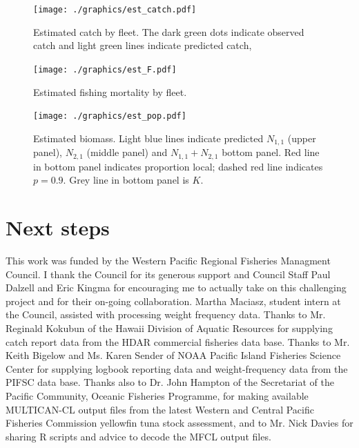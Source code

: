 \documentclass[12pt,letterpaper]{article}
\newcommand\None{{N_{1,1}}}
\newcommand\Ntwo{{N_{2,1}}}
\newcommand\Nsum{{N_{1,1}+N_{2,1}}}
\begin{document}
\begin{figure}
\begin{center}
\texttt{[image: ./graphics/est\_catch.pdf]}
\caption{\label{fig:estC}
Estimated catch by fleet. The dark green dots indicate observed catch
and light green lines indicate predicted catch,
}
\end{center}
\end{figure}

\begin{figure}
\begin{center}
\texttt{[image: ./graphics/est\_F.pdf]}
\caption{\label{fig:estF}
Estimated fishing mortality by fleet.
}
\end{center}
\end{figure}

\begin{figure}
\begin{center}
\texttt{[image: ./graphics/est\_pop.pdf]}
\caption{\label{fig:estB}
Estimated biomass. Light blue lines indicate predicted $\None$ (upper
panel), $\Ntwo$ (middle panel) and $\Nsum$ bottom panel. Red line in
bottom panel indicates proportion local; dashed red line indicates
$p=0.9$. Grey line in bottom panel is $K$.
}
\end{center}
\end{figure}

\section*{Next steps}

\vspace{4ex}
This work was funded by the Western Pacific Regional Fisheries
Managment Council. I thank the Council for its generous support and
Council Staff Paul Dalzell and Eric Kingma for encouraging me to
actually take on this challenging project and for their on-going
collaboration.
Martha Maciasz, student intern at the Council, assisted with
processing weight frequency data.
Thanks to Mr. Reginald Kokubun of the Hawaii Division of Aquatic
Resources for supplying catch report data from the HDAR commercial
fisheries data base.
Thanks to Mr. Keith Bigelow and Ms. Karen Sender of NOAA Pacific
Island Fisheries Science Center for supplying logbook reporting data and
weight-frequency data from the PIFSC data base.
Thanks also to Dr. John Hampton of the Secretariat of the Pacific
Community, Oceanic Fisheries Programme, for making available
MULTICAN-CL output files from the latest Western and Central Pacific
Fisheries Commission yellowfin tuna stock assessment, and to Mr. Nick
Davies for sharing R scripts and advice to decode the MFCL output files.
\end{document}
